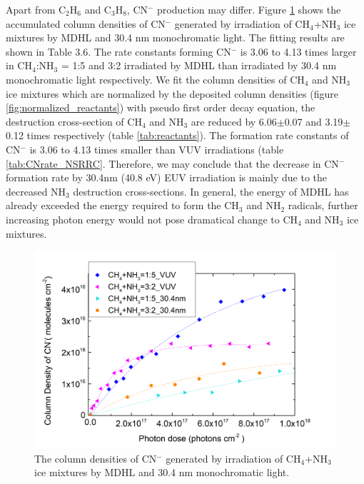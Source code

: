 Apart from C$_2$H$_6$ and C$_3$H$_8$, CN$^-$ production may differ. Figure \ref{fig:CN_NSRRC} shows the accumulated column densities of CN$^-$ generated by irradiation of CH$_4$+NH$_3$ ice mixtures by MDHL and 30.4 nm monochromatic light. The fitting results are shown in Table 3.6. The rate constants forming CN$^-$ is 3.06 to 4.13 times larger in CH$_4$:NH$_3$ = 1:5 and 3:2 irradiated by MDHL than irradiated by 30.4 nm monochromatic light respectively. We fit the column densities of CH$_4$ and NH$_3$ ice mixtures which are normalized by the deposited column densities (figure \ref{fig:normalized_reactants}) with pseudo first order decay equation, the destruction cross-section of CH$_4$ and NH$_3$ are reduced by 6.06$\pm$0.07 and 3.19$\pm$0.12 times respectively (table \ref{tab:reactants}). The formation rate constants of CN$^-$ is 3.06 to 4.13 times smaller than VUV irradiations (table \ref{tab:CNrate_NSRRC}. Therefore, we may conclude that the decrease in CN$^-$ formation rate by 30.4nm (40.8 eV) EUV irradiation is mainly due to the decreased NH$_3$ destruction cross-sections. In general, the energy of MDHL has already exceeded the energy required to form the CH$_3$ and NH$_2$ radicals, further increasing photon energy would not pose dramatical change to CH$_4$ and NH$_3$ ice mixtures.\\

\begin{figure}
\centering
\includegraphics[width=\textwidth]{figures/chapter3/CN_rate_EUV.png}
\caption{The column densities of CN$^-$ generated by irradiation of CH$_4$+NH$_3$ ice mixtures by MDHL and 30.4 nm monochromatic light.}
\label{fig:CN_NSRRC}
\end{figure}

